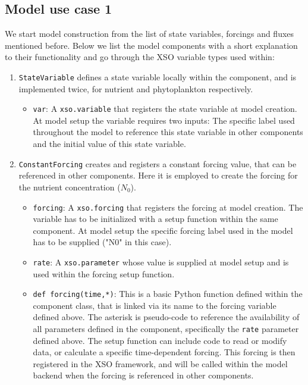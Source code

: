 \documentclass[journal abbreviation, manuscript]{copernicus}
\begin{document}
\subsection{Model use case 1} \label{Appendix:Implementation1}
We start model construction from the list of state variables, forcings and fluxes mentioned before. Below we list the model components with a short explanation to their functionality and go through the XSO variable types used within:
\begin{enumerate}
    \item \texttt{StateVariable} defines a state variable locally within the component, and is implemented twice, for nutrient and phytoplankton respectively.
    \begin{itemize}
        \item \texttt{var}: A \texttt{xso.variable} that registers the state variable at model creation. At model setup the variable requires two inputs: The specific label used throughout the model to reference this state variable in other components and the initial value of this state variable.
    \end{itemize}
    
    \item \texttt{ConstantForcing} creates and registers a constant forcing value, that can be referenced in other components. Here it is employed to create the forcing for the nutrient concentration ($N_0$).
    \begin{itemize}
        \item \texttt{forcing}: A \texttt{xso.forcing} that registers the forcing at model creation. The variable has to be initialized with a setup function within the same component. At model setup the specific forcing label used in the model has to be supplied ("N0" in this case).
        \item \texttt{rate}: A \texttt{xso.parameter} whose value is supplied at model setup and is used within the forcing setup function.
        \item \texttt{def forcing(time,*)}: This is a basic Python function defined within the component class, that is linked via its name to the forcing variable defined above. The asterisk is pseudo-code to reference the availability of all parameters defined in the component, specifically the \texttt{rate} parameter defined above. The setup function can include code to read or modify data, or calculate a specific time-dependent forcing. This forcing is then registered in the XSO framework, and will be called within the model backend when the forcing is referenced in other components.
    \end{itemize}
    

\end{enumerate}
\end{document}
